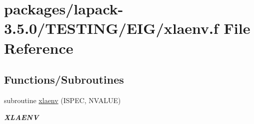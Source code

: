 \hypertarget{EIG_2xlaenv_8f}{}\section{packages/lapack-\/3.5.0/\+T\+E\+S\+T\+I\+N\+G/\+E\+I\+G/xlaenv.f File Reference}
\label{EIG_2xlaenv_8f}
\subsection*{Functions/\+Subroutines}
\begin{DoxyCompactItemize}
\item 
subroutine \hyperlink{group__aux__eig_gae6f1eead77499e53bd640389a95288c4}{xlaenv} (I\+S\+P\+E\+C, N\+V\+A\+L\+U\+E)
\begin{DoxyCompactList}\small\item\em {\bfseries X\+L\+A\+E\+N\+V} \end{DoxyCompactList}\end{DoxyCompactItemize}
